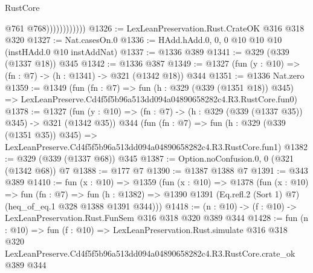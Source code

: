 \begin{lexlean}{RustCore}
\begin{coremodule}
                            @761
                            @768))))))))))))
@1326 := LexLeanPreservation.Rust.CrateOK @316 @318 @320
@1327 := Nat.casesOn.{0}
@1336 := HAdd.hAdd.{0, 0, 0} @10 @10 @10 (instHAdd.{0} @10 instAddNat)
@1337 := @1336 @389
@1341 := @329 (@339 (@1337 @18)) @345
@1342 := @1336 @387
@1349 := @1327 (fun (y : @10) => (fn : @7) -> (h : @1341) -> @321 (@1342 @18)) @344
@1351 := @1336 Nat.zero
@1359 := @1349
    (fun (fn : @7) =>
    fun (h : @329 (@339 (@1351 @18)) @345) =>
    LexLeanPreserve.Cd4f5f5b96a513dd094a04890658282c4.R3.RustCore.fun0)
@1378 := @1327
    (fun (y : @10) => (fn : @7) -> (h : @329 (@339 (@1337 @35)) @345) -> @321 (@1342 @35))
    @344
    (fun (fn : @7) =>
    fun (h : @329 (@339 (@1351 @35)) @345) =>
    LexLeanPreserve.Cd4f5f5b96a513dd094a04890658282c4.R3.RustCore.fun1)
@1382 := @329 (@339 (@1337 @68)) @345
@1387 := Option.noConfusion.{0, 0} (@321 (@1342 @68)) @7
@1388 := @177 @7
@1390 := @1387 @1388 @7
@1391 := @343 @389
@1410 := fun (x : @10) =>
  @1359
    (fun (x : @10) =>
    @1378
      (fun (x : @10) =>
      fun (fn : @7) =>
      fun (h : @1382) =>
      @1390 @1391 (Eq.refl.{2} (Sort 1) @7) (heq_of_eq.{1} @328 @1388 @1391 @344)))
@1418 := (n : @10) -> (f : @10) -> LexLeanPreservation.Rust.FunSem @316 @318 @320 @389 @344
@1428 := fun (n : @10) =>
  fun (f : @10) =>
  LexLeanPreservation.Rust.simulate
    @316
    @318
    @320
    LexLeanPreserve.Cd4f5f5b96a513dd094a04890658282c4.R3.RustCore.crate_ok
    @389
    @344
\end{coremodule}
\end{lexlean}
